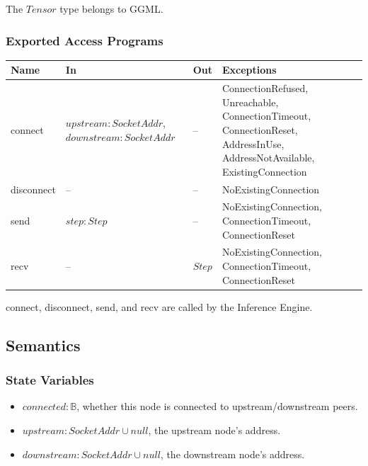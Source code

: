 \documentclass[12pt, titlepage]{article}
\begin{document}
\noindent The $\mathit{Tensor}$ type belongs to GGML.

\subsubsection{Exported Access Programs}

\begin{center}
\begin{tabular}{p{3cm} p{4.5cm} p{1.5cm} p{3.9cm}}
\toprule
\textbf{Name} & \textbf{In} & \textbf{Out} & \textbf{Exceptions} \\
\midrule
connect & $\mathit{upstream:} \mathit{SocketAddr}$, $\mathit{downstream:} \mathit{SocketAddr}$ & -- &
	\mbox{ConnectionRefused}, \mbox{Unreachable}, \mbox{ConnectionTimeout}, \mbox{ConnectionReset}, \mbox{AddressInUse},
	\mbox{AddressNotAvailable}, \mbox{ExistingConnection} \\
disconnect & -- & -- & \mbox{NoExistingConnection} \\
send & $\mathit{step}: \mathit{Step}$ & -- &
	\mbox{NoExistingConnection}, \mbox{ConnectionTimeout}, \mbox{ConnectionReset} \\
recv & -- & $\mathit{Step}$ &
	\mbox{NoExistingConnection}, \mbox{ConnectionTimeout}, \mbox{ConnectionReset} \\
\bottomrule
\end{tabular}
\end{center}

\noindent connect, disconnect, send, and recv are called by the Inference Engine.

\subsection{Semantics}

\subsubsection{State Variables}

\begin{itemize}
	\item $\mathit{connected}: \mathbb{B}$, whether this node is connected to upstream/downstream
		peers.
	\item $\mathit{upstream}: \mathit{SocketAddr} \cup \mathit{null}$, the upstream node's address.
	\item $\mathit{downstream}: \mathit{SocketAddr} \cup \mathit{null}$, the downstream node's address.
\end{itemize}
\end{document}
